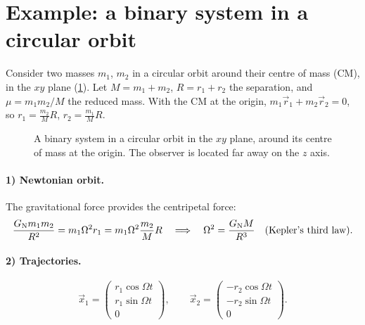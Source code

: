 \section{Example: a binary system in a circular orbit}

Consider two masses $m_1$, $m_2$ in a circular orbit around their centre of mass (CM), in the $xy$ plane (\cref{fig:binary}). Let $M=m_1+m_2$, $R=r_1+r_2$ the separation, and $\mu=m_1m_2/M$ the reduced mass. With the CM at the origin, $m_1\vec r_1+m_2\vec r_2=0$, so $r_1=\frac{m_2}{M}R$, $r_2=\frac{m_1}{M}R$.

\begin{figure}[ht]
\centering
{}
\caption{A binary system in a circular orbit in the $xy$ plane, around its centre of mass at the origin. The observer is located far away on the $z$ axis.}
\label{fig:binary}
\end{figure}

\paragraph{1) Newtonian orbit.} The gravitational force provides the centripetal force:
\[
  \frac{G_{\mathrm N} m_1m_2}{R^2}=m_1\Omega^2r_1=m_1\Omega^2\frac{m_2}{M}R\quad\Longrightarrow\quad\Omega^2=\frac{G_{\mathrm N} M}{R^3}\quad\text{(Kepler's third law)}.
\]
\paragraph{2) Trajectories.}
\[
  \vec x_1=\begin{pmatrix}r_1\cos\Omega t\\ r_1\sin\Omega t\\0\end{pmatrix},\qquad
  \vec x_2=\begin{pmatrix}-r_2\cos\Omega t\\ -r_2\sin\Omega t\\0\end{pmatrix}.
\]
